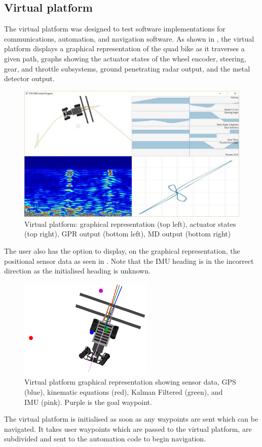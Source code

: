 \documentclass[main.tex]{subfiles}
\begin{document}
\subsection{Virtual platform}
The virtual platform was designed to test software implementations for communications, automation, and navigation software. As shown in , the virtual platform displays a graphical representation of the quad bike as it traverses a given path, graphs showing the actuator states of the wheel encoder, steering, gear, and throttle subsystems, ground penetrating radar output, and the metal detector output.
\begin{figure}[ht]
\includegraphics[width=\textwidth]{4-DetailedDesign/virtualPlatform.jpg}
\centering
\caption{Virtual platform: graphical representation (top left), actuator states (top right), GPR output (bottom left), MD output (bottom right)} 
\end{figure}
The user also has the option to display, on the graphical representation, the positional sensor data as seen in . Note that the IMU heading is in the incorrect direction as the initialised heading is unknown.
\begin{figure}[ht]
\includegraphics[]{4-DetailedDesign/dataVisibleVirtualPlatform.PNG}
\centering
\caption{Virtual platform graphical representation showing sensor data, GPS (blue), kinematic equations (red), Kalman Filtered (green), and IMU (pink). Purple is the goal waypoint.} 
\end{figure}
The virtual platform is initialised as soon as any waypoints are sent which can be navigated. It takes user waypoints which are passed to the virtual platform, are subdivided and sent to the automation code to begin navigation.
\end{document}

